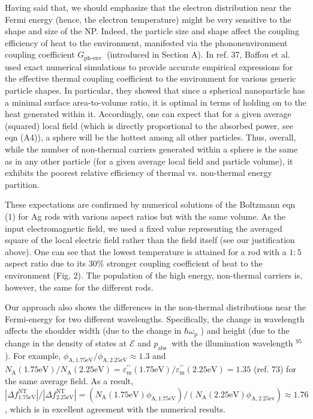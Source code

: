 \documentclass[10pt]{article}
\begin{document}
Having said that, we should emphasize that the electron distribution near the Fermi energy (hence, the electron temperature) might be very sensitive to the shape and size of the NP. Indeed, the particle size and shape affect the coupling efficiency of heat to the environment, manifested via the phononenvironment coupling coefficient $G_{\text {ph-env }}$ (introduced in Section A). In ref. 37, Baffou et al. used exact numerical simulations to provide accurate empirical expressions for the effective thermal coupling coefficient to the environment for various generic particle shapes. In particular, they showed that since a spherical nanoparticle has a minimal surface area-to-volume ratio, it is optimal in terms of holding on to the heat generated within it. Accordingly, one can expect that for a given average (squared) local field (which is directly proportional to the absorbed power, see eqn (A4)), a sphere will be the hottest among all other particles. Thus, overall, while the number of non-thermal carriers generated within a sphere is the same as in any other particle (for a given average local field and particle volume), it exhibits the poorest relative efficiency of thermal vs. non-thermal energy partition.

These expectations are confirmed by numerical solutions of the Boltzmann eqn (1) for Ag rods with various aspect ratios but with the same volume. As the input electromagnetic field, we used a fixed value representing the averaged square of the local electric field rather than the field itself (see our justification above). One can see that the lowest temperature is attained for a rod with a $1: 5$ aspect ratio due to its $30 \%$ stronger coupling coefficient of heat to the environment (Fig. 2). The population of the high energy, non-thermal carriers is, however, the same for the different rods.

Our approach also shows the differences in the non-thermal distributions near the Fermi-energy for two different wavelengths. Specifically, the change in wavelength affects the shoulder width (due to the change in $\hbar \omega_{\mathrm{p}}$ ) and height (due to the change in the density of states at $\mathcal{E}$ and $p_{\text {abs }}$ with the illumination wavelength ${ }^{95}$ ). For example, $\phi_{\mathrm{A}, 1.75 \mathrm{eV}} / \phi_{\mathrm{A}, 2.25 \mathrm{eV}} \approx 1.3$ and $N_{\mathrm{A}}(1.75 \mathrm{eV}) / N_{\mathrm{A}}(2.25 \mathrm{eV})=\varepsilon_{\mathrm{m}}^{\prime \prime}(1.75 \mathrm{eV}) / \varepsilon_{\mathrm{m}}^{\prime \prime}(2.25 \mathrm{eV})=1.35$ (ref. 73) for the same average field. As a result, $\left|\Delta f_{1.75 \mathrm{eV}}^{\mathrm{NT}}\right| /\left|\Delta f_{2.25 \mathrm{eV}}^{\mathrm{NT}}\right|=\left(N_{\mathrm{A}}(1.75 \mathrm{eV}) \phi_{\mathrm{A}, 1.75 \mathrm{eV}}\right) /\left(N_{\mathrm{A}}(2.25 \mathrm{eV})\right. \left.\phi_{\mathrm{A}, 2.25 \mathrm{ev}}\right) \approx 1.76$, which is in excellent agreement with the numerical results.
\end{document}
